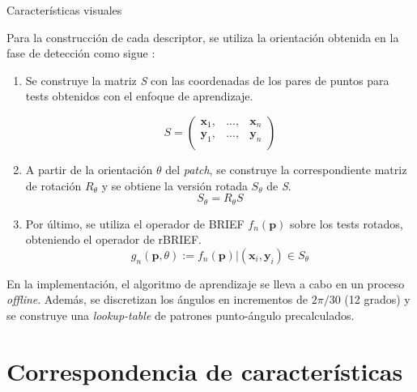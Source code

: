 \begin{section}{Características visuales}
\begin{subsection}
\begin{subsection}
\begin{subsection}
Para la construcción de cada descriptor, se utiliza la orientación obtenida en la fase de detección como sigue :
\begin{enumerate}

\item Se construye la matriz \textit{S} con las coordenadas de los pares de puntos para tests obtenidos con el enfoque de aprendizaje.

\begin{equation}
S =
\left(
\begin{array}{ccc}
\textbf{x}_{1},& ..., &\textbf{x}_{n} \\
\textbf{y}_{1},& ..., &\textbf{y}_{n} \\
\end{array}
\right)
\end{equation}

\item A partir de la orientación $\theta$ del \textit{patch}, se construye la correspondiente matriz de rotación $R_{\theta}$ y se obtiene la versión rotada $ S_{\theta} $ de \textit{S}.
\begin{equation}
S_{\theta} = R_{\theta}S
\end{equation}
\item Por último, se utiliza el operador de BRIEF $f_{n}(\textbf{p})$ sobre los tests rotados, obteniendo el operador de rBRIEF.
\begin{equation}
g_{n}(\textbf{p}, \theta) := f_{n}(\textbf{p})|(\textbf{x}_{i}, \textbf{y}_{i}) \in S_{\theta}
\end{equation}

\end{enumerate}

En la implementación, el algoritmo de aprendizaje se lleva a cabo en un proceso \textit{offline}. Además, se discretizan los ángulos en incrementos de $2\pi/30$ (12 grados) y se construye una \textit{lookup-table} de patrones punto-ángulo precalculados.

\end{subsection}
\end{subsection}

\end{subsection}

\end{section}

\section{Correspondencia de características}

